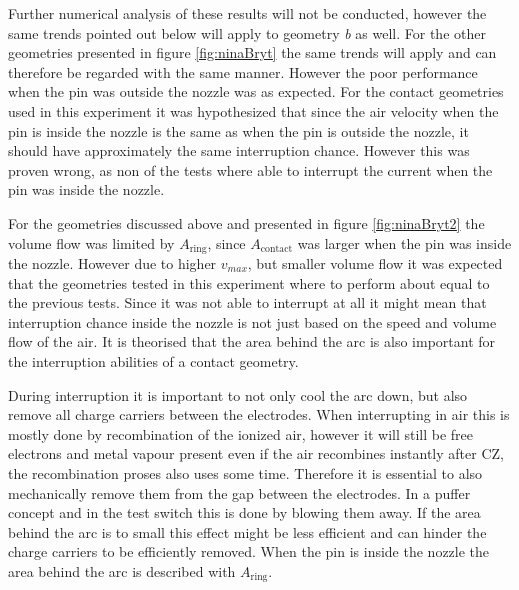 \documentclass[10pt,a4paper,twoside]{article}
\begin{document}
Further numerical analysis of these results will not be conducted, however the same trends pointed out below will apply to geometry \textit{b} as well. For the other geometries presented in figure \ref{fig:ninaBryt} the same trends will apply and can therefore be regarded with the same manner. However the poor performance when the pin was outside the nozzle was as expected. For the contact geometries used in this experiment it was hypothesized that since the air velocity when the pin is inside the nozzle is the same as when the pin is outside the nozzle, it should have approximately the same interruption chance. However this was proven wrong, as non of the tests where able to interrupt the current when the pin was inside the nozzle.

For the geometries discussed above and presented in figure \ref{fig:ninaBryt2} the volume flow was limited by $A_\mathrm{{ring}}$, since $A_\mathrm{{contact}}$ was larger when the pin was inside the nozzle. However due to higher $v_{max}$, but smaller volume flow it was expected that the geometries tested in this experiment where to perform about equal to the previous tests. Since it was not able to interrupt at all it might mean that interruption chance inside the nozzle is not just based on the speed and volume flow of the air. It is theorised that the area behind the arc is also important for the interruption abilities of a contact geometry.

During interruption it is important to not only cool the arc down, but also remove all charge carriers between the electrodes. When interrupting in air this is mostly done by recombination of the ionized air, however it will still be free electrons and metal vapour present even if the air recombines instantly after CZ, the recombination proses also uses some time. Therefore it is essential to also mechanically remove them from the gap between the electrodes. In a puffer concept and in the test switch this is done by blowing them away. If the area behind the arc is to small this effect might be less efficient and can hinder the charge carriers to be efficiently removed. When the pin is inside the nozzle the area behind the arc is described with $A_\mathrm{{ring}}$.
\end{document}
